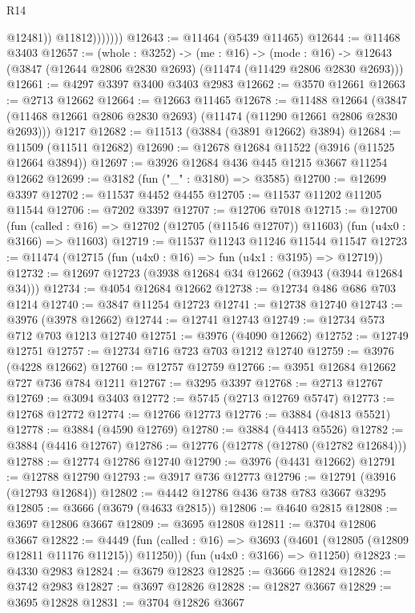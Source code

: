 \begin{lexlean}{R14}
\begin{coremodule}
                      @12481))
                  @11812)))))))
@12643 := @11464 (@5439 @11465)
@12644 := @11468 @3403
@12657 := (whole : @3252) ->
  (me : @16) ->
  (mode : @16) -> @12643 (@3847 (@12644 @2806 @2830 @2693) (@11474 (@11429 @2806 @2830 @2693)))
@12661 := @4297 @3397 @3400 @3403 @2983
@12662 := @3570 @12661
@12663 := @2713 @12662
@12664 := @12663 @11465
@12678 := @11488
    @12664
    (@3847 (@11468 @12661 @2806 @2830 @2693) (@11474 (@11290 @12661 @2806 @2830 @2693)))
    @1217
@12682 := @11513 (@3884 (@3891 @12662) @3894)
@12684 := @11509 (@11511 @12682)
@12690 := @12678 @12684 @11522 (@3916 (@11525 @12664 @3894))
@12697 := @3926 @12684 @436 @445 @1215 @3667 @11254 @12662
@12699 := @3182 (fun ("_" : @3180) => @3585)
@12700 := @12699 @3397
@12702 := @11537 @4452 @4455
@12705 := @11537 @11202 @11205 @11544
@12706 := @7202 @3397
@12707 := @12706 @7018
@12715 := @12700
    (fun (called : @16) => @12702 (@12705 (@11546 @12707)) @11603)
    (fun (u4x0 : @3166) => @11603)
@12719 := @11537 @11243 @11246 @11544 @11547
@12723 := @11474 (@12715 (fun (u4x0 : @16) => fun (u4x1 : @3195) => @12719))
@12732 := @12697 @12723 (@3938 @12684 @34 @12662 (@3943 (@3944 @12684 @34)))
@12734 := @4054 @12684 @12662
@12738 := @12734 @486 @686 @703 @1214
@12740 := @3847 @11254 @12723
@12741 := @12738 @12740
@12743 := @3976 (@3978 @12662)
@12744 := @12741 @12743
@12749 := @12734 @573 @712 @703 @1213 @12740
@12751 := @3976 (@4090 @12662)
@12752 := @12749 @12751
@12757 := @12734 @716 @723 @703 @1212 @12740
@12759 := @3976 (@4228 @12662)
@12760 := @12757 @12759
@12766 := @3951 @12684 @12662 @727 @736 @784 @1211
@12767 := @3295 @3397
@12768 := @2713 @12767
@12769 := @3094 @3403
@12772 := @5745 (@2713 @12769 @5747)
@12773 := @12768 @12772
@12774 := @12766 @12773
@12776 := @3884 (@4813 @5521)
@12778 := @3884 (@4590 @12769)
@12780 := @3884 (@4413 @5526)
@12782 := @3884 (@4416 @12767)
@12786 := @12776 (@12778 (@12780 (@12782 @12684)))
@12788 := @12774 @12786 @12740
@12790 := @3976 (@4431 @12662)
@12791 := @12788 @12790
@12793 := @3917 @736 @12773
@12796 := @12791 (@3916 (@12793 @12684))
@12802 := @4442 @12786 @436 @738 @783 @3667 @3295
@12805 := @3666 (@3679 (@4633 @2815))
@12806 := @4640 @2815
@12808 := @3697 @12806 @3667
@12809 := @3695 @12808
@12811 := @3704 @12806 @3667
@12822 := @4449
    (fun (called : @16) => @3693 (@4601 (@12805 (@12809 @12811 @11176 @11215)) @11250))
    (fun (u4x0 : @3166) => @11250)
@12823 := @4330 @2983
@12824 := @3679 @12823
@12825 := @3666 @12824
@12826 := @3742 @2983
@12827 := @3697 @12826
@12828 := @12827 @3667
@12829 := @3695 @12828
@12831 := @3704 @12826 @3667

\end{coremodule}
\end{lexlean}
